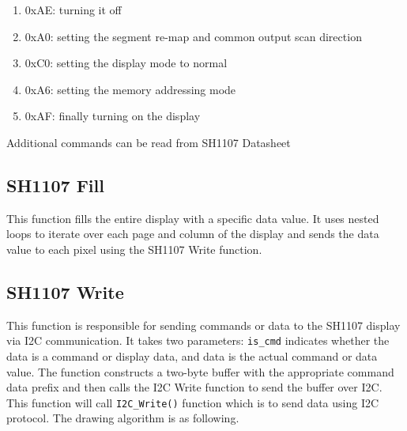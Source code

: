 \begin{enumerate}
	\item 0xAE: turning it off 
	\item 0xA0: setting the segment re-map and common output scan direction 
	\item 0xC0: setting the display mode to normal
	\item 0xA6: setting the memory addressing mode
	\item 0xAF: finally turning on the display
\end{enumerate}

Additional commands can be read from SH1107 Datasheet~\cite{SH1107_datasheet}

\subsection{SH1107 Fill}
This function fills the entire display with a specific data value. It uses nested loops to iterate over each page and column of the display and sends the data value to each pixel using the SH1107 Write function.

\subsection{SH1107 Write}
This function is responsible for sending commands or data to the SH1107 display via I2C communication. It takes two parameters: \verb'is_cmd' indicates whether the data is a command or display data, and data is the actual command or data value. The function constructs a two-byte buffer with the appropriate command data prefix and then calls the I2C Write function to send the buffer over I2C.
This function will call \verb|I2C_Write()| function which is to send data using I2C protocol. The drawing algorithm is as following.


